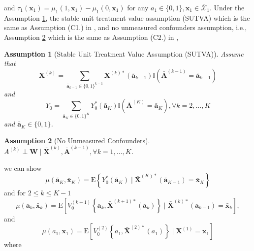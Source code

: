 \documentclass[11pt]{article}
\theoremstyle{referenceplain}
\newtheorem{assumption}{Assumption}
\theoremstyle{referencedefinition}
\theoremstyle{referenceremark}
\begin{document}
and $\tau_1\left(\mathbf{x}_1\right)=\mu_1\left(1, \mathbf{x}_1\right)-\mu_1\left(0, \mathbf{x}_1\right)$ for any $a_1 \in\{0,1\}, \mathbf{x}_1 \in \bar{\mathcal{X}}_1$. Under the Assumption \ref{B1}, the stable unit treatment value assumption (SUTVA) which is the same as Assumption (C1.) in \citet{shi2020breaking}, and no unmeasured confounders assumption, i.e.,  Assumption \ref{B2} which is the same as Assumption (C2.) in \citet{shi2020breaking},  
\begin{assumption}[Stable Unit Treatment Value Assumption (SUTVA)]\label{B1}
     Assume that $$\mathbf{X}^{(k)}=\sum_{\bar{\mathbf{a}}_{k-1} \in\{0,1\}^{k-1}} \mathbf{X}^{(k) *}\left(\bar{\mathbf{a}}_{k-1}\right) \mathbb{I}\left(\bar{\mathbf{A}}^{(k-1)}=\bar{\mathbf{a}}_{k-1}\right)$$ and $$Y_0=\sum_{\bar{\mathbf{a}}_K \in\{0,1\}^K} Y_0^*\left(\bar{\mathbf{a}}_K\right) \mathbb{I}\left(\bar{\mathbf{A}}^{(K)}=\bar{\mathbf{a}}_K\right), \forall k=2, \ldots, K$$ and $\bar{\mathbf{a}}_K \in\{0,1\}$.
\end{assumption}
\begin{assumption}[No Unmeasured Confounders]\label{B2}
    $A^{(k)} \perp \mathbf{W} \mid \bar{\mathbf{X}}^{(k)}, \bar{\mathbf{A}}^{(k-1)}, \forall k=1, \ldots, K$.
\end{assumption}
we can show
$$
\mu\left(\bar{\mathbf{a}}_K, \bar{\mathbf{x}}_K\right)=\mathrm{E}\left\{Y_0^*\left(\bar{\mathbf{a}}_K\right) \mid \bar{\mathbf{X}}^{(K) *}\left(\bar{\mathbf{a}}_{K-1}\right)=\bar{\mathbf{x}}_K\right\}
$$
and for $2 \leq k \leq K-1$
$$
\mu\left(\bar{\mathbf{a}}_k, \bar{\mathbf{x}}_k\right)=\mathrm{E}\left[V_0^{(k+1)}\left\{\bar{\mathbf{a}}_k, \bar{\mathbf{X}}^{(k+1) *}\left(\bar{\mathbf{a}}_k\right)\right\} \mid \bar{\mathbf{X}}^{(k) *}\left(\bar{\mathbf{a}}_{k-1}\right)=\bar{\mathbf{x}}_k\right],
$$
and
$$
\mu\left(a_1, \mathbf{x}_1\right)=\mathrm{E}\left[V_0^{(2)}\left\{a_1, \bar{\mathbf{X}}^{(2) *}\left(a_1\right)\right\} \mid \mathbf{X}^{(1)}=\mathbf{x}_1\right]
$$
where
\end{document}
